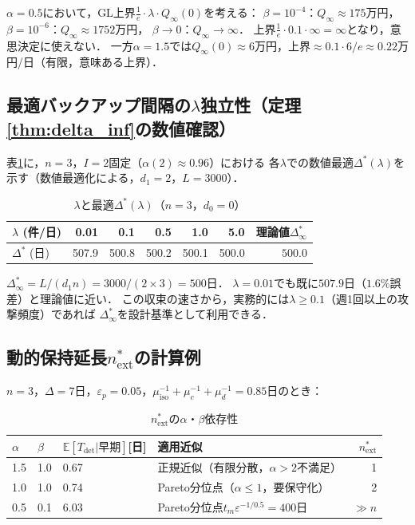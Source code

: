 \documentclass[12pt,a4paper]{article}
\theoremstyle{plain}
\theoremstyle{definition}
\theoremstyle{remark}
\newcommand{\E}{\mathbb{E}}
\newcommand{\Qinf}{Q_{\infty}}
\newcommand{\Tdet}{T_{\mathrm{det}}}
\newcommand{\Dopt}{\Delta^{*}}
\newcommand{\Dinf}{\Delta^{*}_{\infty}}
\begin{document}
$\alpha=0.5$において，GL上界$\frac{1}{e}\cdot\lambda\cdot\Qinf(0)$を考える：
$\beta=10^{-4}$：$\Qinf\approx175$万円，$\beta=10^{-6}$：$\Qinf\approx1752$万円，
$\beta\to0$：$\Qinf\to\infty$．
上界$\frac{1}{e}\cdot0.1\cdot\infty=\infty$となり，意思決定に使えない．
一方$\alpha=1.5$では$\Qinf(0)\approx6$万円，上界$\approx0.1\cdot6/e\approx0.22$万円/日（有限，意味ある上界）．

\subsection{最適バックアップ間隔の$\lambda$独立性（定理\ref{thm:delta_inf}の数値確認）}

表\ref{tab:delta_lambda}に，$n=3$，$I=2$固定（$\alpha(2)\approx0.96$）における
各$\lambda$での数値最適$\Dopt(\lambda)$を示す（数値最適化による，$d_1=2$，$L=3000$）．

\begin{table}[h]
\centering
\caption{$\lambda$と最適$\Dopt(\lambda)$（$n=3$，$d_0=0$）}
\label{tab:delta_lambda}
\begin{tabular}{@{}lrrrrrr@{}}
\toprule
$\lambda$ (件/日) & 0.01 & 0.1 & 0.5 & 1.0 & 5.0 & 理論値$\Dinf$ \\
\midrule
$\Dopt$ (日) & 507.9 & 500.8 & 500.2 & 500.1 & 500.0 & $\mathbf{500.0}$ \\
\bottomrule
\end{tabular}
\end{table}

$\Dinf=L/(d_1 n)=3000/(2\times3)=500$日．
$\lambda=0.01$でも既に$507.9$日（$1.6\%$誤差）と理論値に近い．
この収束の速さから，実務的には$\lambda\ge0.1$（週1回以上の攻撃頻度）であれば
$\Dinf$を設計基準として利用できる．

\subsection{動的保持延長$n_{\mathrm{ext}}^*$の計算例}

$n=3$，$\Delta=7$日，$\varepsilon_p=0.05$，$\mu_{\mathrm{iso}}^{-1}+\mu_c^{-1}+\mu_d^{-1}=0.85$日のとき：

\begin{table}[h]
\centering
\caption{$n_{\mathrm{ext}}^*$の$\alpha$・$\beta$依存性}
\label{tab:next}
\begin{tabular}{@{}lllp{33mm}r@{}}
\toprule
$\alpha$ & $\beta$ & $\E[\Tdet|\text{早期}]$[日] & 適用近似 & $n_{\mathrm{ext}}^*$ \\
\midrule
1.5 & 1.0 & 0.67 & 正規近似（有限分散，$\alpha>2$不満足） & 1 \\
1.0 & 1.0 & 0.74 & Pareto分位点（$\alpha\le1$，要保守化） & 2 \\
0.5 & 0.1 & 6.03 & Pareto分位点$t_m\varepsilon^{-1/0.5}=400$日 & $\gg n$ \\
\bottomrule
\end{tabular}
\end{table}
\end{document}
